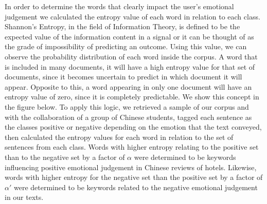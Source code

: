 \documentclass[review]{elsarticle}
\begin{document}
In order to determine the words that clearly impact the user’s emotional judgement we calculated the entropy value of each word in relation to each class. Shannon’s Entropy, in the field of Information Theory, is defined to be the expected value of the information content in a signal\cite[][]{shannon1948} or it can be thought of as the grade of impossibility of predicting an outcome. Using this value, we can observe the probability distribution of each word inside the corpus. A word that is included in many documents, it will have a high entropy value for that set of documents, since it becomes uncertain to predict in which document it will appear. Opposite to this, a word appearing in only one document will have an entropy value of zero, since it is completely predictable. We show this concept in the figure below. To apply this logic, we retrieved a sample of our corpus and with the collaboration of a group of Chinese students, tagged each sentence as the classes positive or negative depending on the emotion that the text conveyed, then calculated the entropy values for each word in relation to the set of sentences from each class. Words with higher entropy relating to the positive set than to the negative set by a factor of \(\alpha\) were determined to be keywords influencing positive emotional judgement in Chinese reviews of hotels. Likewise, words with higher entropy for the negative set than the positive set by a factor of \(\alpha'\) were determined to be keywords related to the negative emotional judgement in our texts. 
\end{document}

